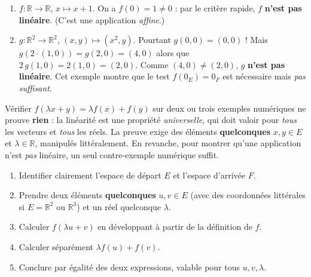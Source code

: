 \documentclass[11pt]{article}
\begin{document}
\begin{exemplebox}
\begin{enumerate}
\item $f : \mathbb{R} \to \mathbb{R}$, $x \mapsto x + 1$. On a $f(0) = 1 \neq 0$ : par le critère rapide, $f$ \textbf{n'est pas linéaire}. (C'est une application \emph{affine}.)
\item $g : \mathbb{R}^2 \to \mathbb{R}^2$, $(x, y) \mapsto (x^2, y)$. Pourtant $g(0,0) = (0,0)$ ! Mais $g(2 \cdot (1, 0)) = g(2, 0) = (4, 0)$ alors que $2\,g(1, 0) = 2(1, 0) = (2, 0)$. Comme $(4,0) \neq (2,0)$, $g$ \textbf{n'est pas linéaire}. Cet exemple montre que le test $f(0_E) = 0_F$ est nécessaire mais \emph{pas suffisant}.
\end{enumerate}
\end{exemplebox}

\begin{attention}
Vérifier $f(\lambda x + y) = \lambda f(x) + f(y)$ sur deux ou trois exemples numériques ne prouve \textbf{rien} : la linéarité est une propriété \emph{universelle}, qui doit valoir pour \emph{tous} les vecteurs et \emph{tous} les réels. La preuve exige des éléments \textbf{quelconques} $x, y \in E$ et $\lambda \in \mathbb{R}$, manipulés littéralement. En revanche, pour montrer qu'une application n'est \emph{pas} linéaire, un seul contre-exemple numérique suffit.
\end{attention}

\begin{methode}
\begin{enumerate}
\item Identifier clairement l'espace de départ $E$ et l'espace d'arrivée $F$.
\item Prendre deux éléments \textbf{quelconques} $u, v \in E$ (avec des coordonnées littérales si $E = \mathbb{R}^2$ ou $\mathbb{R}^3$) et un réel quelconque $\lambda$.
\item Calculer $f(\lambda u + v)$ en développant à partir de la définition de $f$.
\item Calculer séparément $\lambda f(u) + f(v)$.
\item Conclure par égalité des deux expressions, valable pour tous $u, v, \lambda$.
\end{enumerate}
\end{methode}
\end{document}
